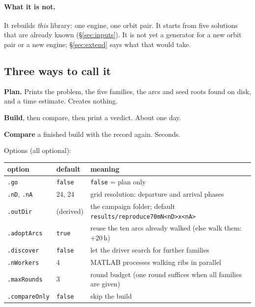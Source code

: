 \documentclass[11pt]{article}
\renewcommand{\_}{\textunderscore\allowbreak}
\newcommand{\code}[1]{\texttt{#1}}
\newcommand{\file}[1]{\texttt{\small #1}}
\begin{document}
\paragraph{What it is not.} It rebuilds \emph{this} library: one engine,
one orbit pair. It starts from five solutions that are already known
(\S\ref{sec:inputs}). It is not yet a generator for a new orbit pair or a
new engine; \S\ref{sec:extend} says what that would take.

\subsection{Three ways to call it}

\begin{description}[leftmargin=0.6cm, style=nextline, itemsep=3pt]
\item[\code{reproduce\_library\_70mN}]
  \textbf{Plan.} Prints the problem, the five families, the arcs and seed
  roots found on disk, and a time estimate. Creates nothing.
\item[\code{reproduce\_library\_70mN(struct('go',true))}]
  \textbf{Build}, then compare, then print a verdict. About one day.
\item[\code{reproduce\_library\_70mN(struct('compareOnly',true))}]
  \textbf{Compare} a finished build with the record again. Seconds.
\end{description}

\noindent Options (all optional):

\begin{center}\small
\begin{tabular}{@{}L{0.17\textwidth}L{0.12\textwidth}L{0.62\textwidth}@{}}
\toprule
option & default & meaning \\
\midrule
\code{.go} & \code{false} & \code{false} = plan only \\
\code{.nD}, \code{.nA} & 24, 24 & grid resolution: departure and arrival phases \\
\code{.outDir} & (derived) & the campaign folder; default \file{results/reproduce\_70mN\_<nD>x<nA>} \\
\code{.adoptArcs} & \code{true} & reuse the ten arcs already walked (else walk them: $+20$\,h) \\
\code{.discover} & \code{false} & let the driver search for further families \\
\code{.nWorkers} & 4 & MATLAB processes walking ribs in parallel \\
\code{.maxRounds} & 3 & round budget (one round suffices when all families are given) \\
\code{.compareOnly} & \code{false} & skip the build \\
\bottomrule
\end{tabular}
\end{center}
\end{document}
